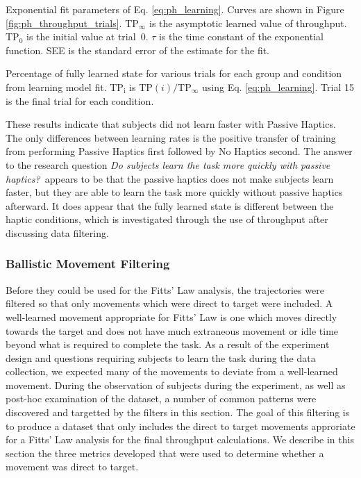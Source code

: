 \begin{table}
    \centering
    \caption{Exponential fit parameters of Eq. \ref{eq:ph_learning}. Curves are shown in Figure \ref{fig:ph_throughput_trials}. $\mathrm{TP}_{\infty}$ is the asymptotic learned value of throughput. $\mathrm{TP}_0$ is the initial value at trial~0. $\tau$ is the time constant of the exponential function. SEE is the standard error of the estimate for the fit.}
    \label{tab:ph_tp_regression}
\end{table}

\begin{table}
    \centering
    \caption{Percentage of fully learned state for various trials for each group and condition from learning model fit. $\mathrm{TP_i}$ is $\mathrm{TP}(i)/\mathrm{TP}_{\infty}$ using Eq. \ref{eq:ph_learning}. Trial 15 is the final trial for each condition.}
    \label{tab:ph_tp_regression_values}
\end{table}

These results indicate that subjects did not learn faster with Passive Haptics.
The only differences between learning rates is the positive transfer of training from performing Passive Haptics first followed by No Haptics second.
The answer to the research question \textit{Do subjects learn the task more quickly with passive haptics?}\ appears to be that the passive haptics does not make subjects learn faster, but they are able to learn the task more quickly without passive haptics afterward.
It does appear that the fully learned state is different between the haptic conditions, which is investigated through the use of throughput after discussing data filtering.

\subsubsection{Ballistic Movement Filtering}
\label{sec:ph_ballistic_filter}

Before they could be used for the Fitts' Law analysis, the trajectories were filtered so that only movements which were direct to target were included.
A well-learned movement appropriate for Fitts' Law is one which moves directly towards the target and does not have much extraneous movement or idle time beyond what is required to complete the task.
As a result of the experiment design and questions requiring subjects to learn the task during the data collection, we expected many of the movements to deviate from a well-learned movement.
During the observation of subjects during the experiment, as well as post-hoc examination of the dataset, a number of common patterns were discovered and targetted by the filters in this section.
The goal of this filtering is to produce a dataset that only includes the direct to target movements approriate for a Fitts' Law analysis for the final throughput calculations.
We describe in this section the three metrics developed that were used to determine whether a movement was direct to target.


